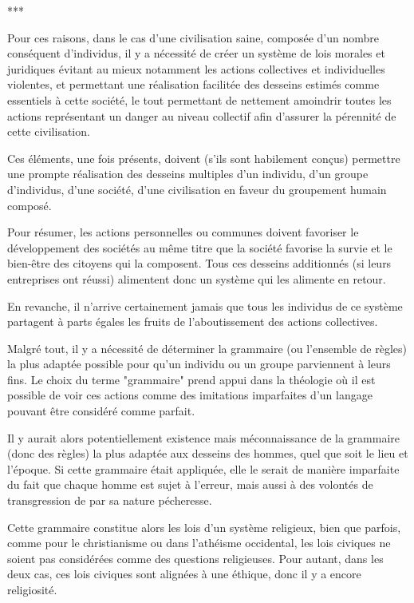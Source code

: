 \begin{center}
***
\end{center}

Pour ces raisons, dans le cas d'une civilisation saine, composée d’un nombre conséquent d’individus, il y a nécessité de créer un système de lois morales et juridiques évitant au mieux notamment les actions collectives et individuelles violentes, et permettant une réalisation facilitée des desseins estimés comme essentiels à cette société, le tout permettant de nettement amoindrir toutes les actions représentant un danger au niveau collectif afin d'assurer la pérennité de cette civilisation.

Ces éléments, une fois présents, doivent (s’ils sont habilement conçus) permettre une prompte réalisation des desseins multiples d’un individu, d’un groupe d’individus, d’une société, d’une civilisation en faveur du groupement humain composé.

Pour résumer, les actions personnelles ou communes doivent favoriser le développement des sociétés au même titre que la société favorise la survie et le bien-être des citoyens qui la composent. Tous ces desseins additionnés (si leurs entreprises ont réussi) alimentent donc un système qui les alimente en retour.

En revanche, il n’arrive certainement jamais que tous les individus de ce système partagent à parts égales les fruits de l’aboutissement des actions collectives.

Malgré tout, il y a nécessité de déterminer la grammaire (ou l'ensemble de règles) la plus adaptée possible pour qu’un individu ou un groupe parviennent à leurs fins. Le choix du terme "grammaire" prend appui dans la théologie où il est possible de voir ces actions comme des imitations imparfaites d’un langage pouvant être considéré comme parfait.

Il y aurait alors potentiellement existence mais méconnaissance de la grammaire (donc des règles) la plus adaptée aux desseins des hommes, quel que soit le lieu et l’époque. Si cette grammaire était appliquée, elle le serait de manière imparfaite du fait que chaque homme est sujet à l'erreur, mais aussi à des volontés de transgression de par sa nature pécheresse.

Cette grammaire constitue alors les lois d'un système religieux, bien que parfois, comme pour le christianisme ou dans l'athéisme occidental, les lois civiques ne soient pas considérées comme des questions religieuses. Pour autant, dans les deux cas, ces lois civiques sont alignées à une éthique, donc il y a encore religiosité.

